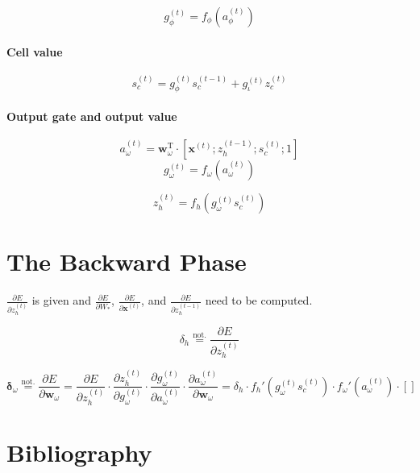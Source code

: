 \documentclass[11pt]{article}
\begin{document}
$$g_{\phi}^{(t)} = f_{\phi}\left(a_{\phi}^{(t)}\right)$$

\paragraph{Cell value}

$$s_c^{(t)} = g_{\phi}^{(t)} s_c^{(t-1)} + g_{\iota}^{(t)} z_{c}^{(t)}$$

\paragraph{Output gate and output value}

$$a_{\omega}^{(t)} = \mathbf{w}_{\omega}^{\text{T}} \cdot \left[\mathbf{x}^{(t)}; z_{h}^{(t-1)}; s_c^{(t)}; 1\right]$$
$$g_{\omega}^{(t)} = f_{\omega}\left(a_{\omega}^{(t)}\right)$$

$$z_h^{(t)} = f_h\left(g_{\omega}^{(t)} s_c^{(t)}\right)$$

\section{The Backward Phase}

$\displaystyle\frac{\partial E}{\partial z_h^{(t)}}$ is given and $\displaystyle \frac{\partial E}{\partial W_{*}}$, $\displaystyle \frac{\partial E}{\partial \mathbf{x}^{(t)}}$, and $\displaystyle \frac{\partial E}{\partial z_{h}^{(t-1)}}$ need to be computed.

$$\delta_{h} \overset{\text{not.}}{=} \displaystyle \frac{\partial E}{\partial z_h^{(t)}}$$

$$\boldsymbol{\delta}_{\omega} \overset{\text{not.}}{=} \displaystyle \frac{\partial E}{\partial \mathbf{w}_{\omega}} = \displaystyle \frac{\partial E}{\partial z_h^{(t)}} \cdot \displaystyle \frac{\partial z_h^{(t)}}{\partial g_{\omega}^{(t)}} \cdot \displaystyle \frac{\partial g_{\omega}^{(t)}}{\partial a_{\omega}^{(t)}} \cdot \displaystyle \frac{\partial a_{\omega}^{(t)}}{\partial \mathbf{w}_{\omega}} = \delta_h \cdot f_h'\left(g_{\omega}^{(t)} s_c^{(t)}\right) \cdot f_{\omega}'\left(a_{\omega}^{(t)}\right) \cdot []$$

\appendix
\section{Bibliography}
\end{document}

